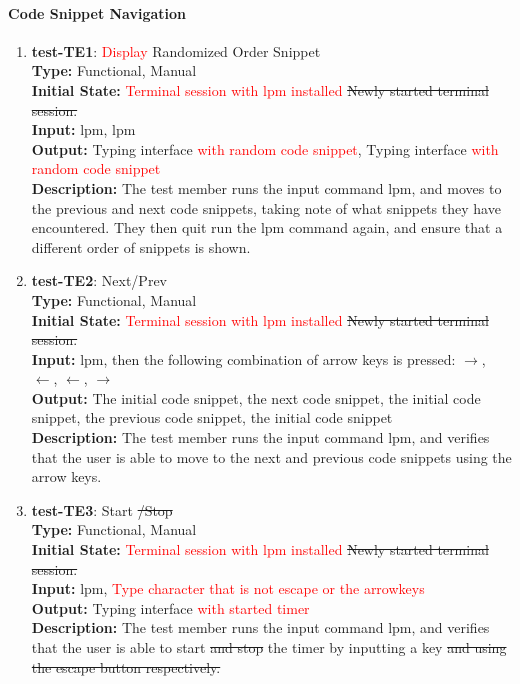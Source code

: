 \documentclass[12pt, titlepage]{article}
\begin{document}
\paragraph{Code Snippet Navigation}
\begin{enumerate}

\item{\textbf{test-TE1}: \textcolor{red}{Display} Randomized Order Snippet\\}
\textbf{Type:} Functional, Manual \\
\textbf{Initial State:} \textcolor{red}{Terminal session with lpm installed} \sout{Newly started terminal session.} \\
\textbf{Input:} lpm, lpm \\
\textbf{Output:} Typing interface \textcolor{red}{with random code snippet}, Typing interface \textcolor{red}{with random code snippet}\\
\textbf{Description:} The test member runs the input command lpm, and moves to the previous and next code snippets, taking note of what snippets they have encountered. They then quit run the lpm command again, and ensure that a different order of snippets is shown. \\

\item{\textbf{test-TE2}: Next/Prev\\}
\textbf{Type:} Functional, Manual \\
\textbf{Initial State:} \textcolor{red}{Terminal session with lpm installed} \sout{Newly started terminal session.} \\
\textbf{Input:} lpm, then the following combination of arrow keys is pressed: $\rightarrow$, $\leftarrow$, $\leftarrow$, $\rightarrow$\\
\textbf{Output:} The initial code snippet, the next code snippet, the initial code snippet, the previous code snippet, the initial code snippet\\
\textbf{Description:} The test member runs the input command lpm, and verifies that the user is able to move to the next and previous code snippets using the arrow keys. \\

\item{\textbf{test-TE3}: Start \sout{/Stop}\\}
\textbf{Type:} Functional, Manual \\
\textbf{Initial State:} \textcolor{red}{Terminal session with lpm installed} \sout{Newly started terminal session.} \\
\textbf{Input:} lpm, \textcolor{red}{Type character that is not escape or the arrowkeys} \\
\textbf{Output:} Typing interface \textcolor{red}{with started timer} \\
\textbf{Description:} The test member runs the input command lpm, and verifies that the user is able to start \sout{and stop} the timer by inputting a key \sout{and using the escape button respectively.} \\


\end{enumerate}
\end{document}
